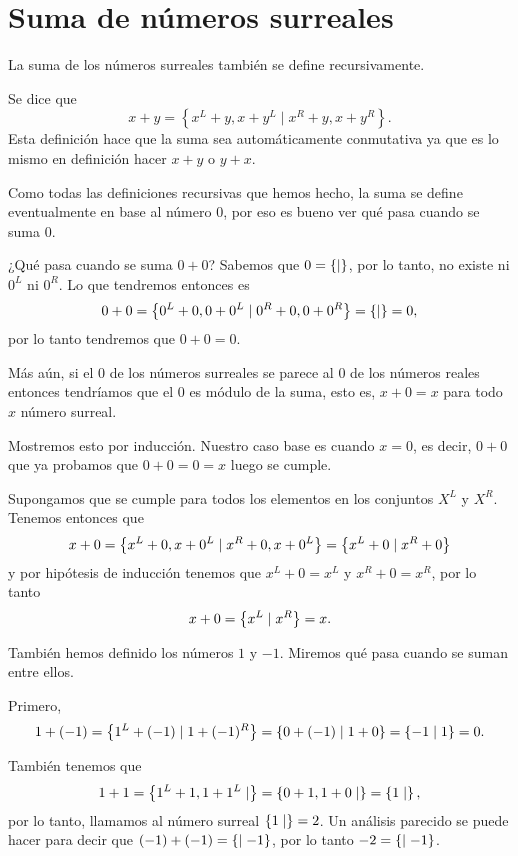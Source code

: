 \section{Suma de números surreales}

    La suma de los números surreales también se define recursivamente.
    
    \begin{definition}
        Se dice que
        \[
            x + y  = \left\{x^L+y, x+y^L\;|\;x^R+y, x+y^R\right\}.
        \]
        Esta definici\'on hace que la suma sea autom\'aticamente conmutativa ya que es lo mismo en definici\'on hacer $x+y$ o $y+x$.
    \end{definition}

    Como todas las definiciones recursivas que hemos hecho, la suma se define eventualmente en base al número $0$, por eso es bueno ver qué pasa cuando se suma $0$.

    \begin{example}
        ¿Qué pasa cuando se suma $0+0$? Sabemos que $0 = \left\{\mid \right\}$, por lo tanto, no existe ni $0^L$ ni $0^R$. Lo que tendremos entonces es
        \[
            0+0 = \left\{0^L+0, 0+0^L\mid 0^R+0, 0+0^R\right\} = \left\{\mid \right\} = 0,
        \]
        por lo tanto tendremos que $0+0 = 0$.
    \end{example}

    \begin{example}
        Más aún, si el $0$ de los números surreales se parece al $0$ de los números reales entonces tendríamos que el $0$ es módulo de la suma, esto es, $x+0 = x$ para todo $x$ n\'umero surreal.

        Mostremos esto por inducci\'on. Nuestro caso base es cuando $x = 0$, es decir, $0+0$ que ya probamos que $0+0=0=x$ luego se cumple.

        Supongamos que se cumple para todos los elementos en los conjuntos $X^L$ y $X^R$. Tenemos entonces que
        \[
            x + 0 = \left\{x^L+0, x+0^L\mid x^R+0, x+0^L\right\} = \left\{x^L+0\mid x^R+0\right\}
        \]
        y por hip\'otesis de inducci\'on tenemos que $x^L+0 = x^L$ y $x^R+0 = x^R$, por lo tanto 
        \[
            x + 0 = \left\{x^L\mid x^R\right\} = x.
        \]
    \end{example}

    \begin{example}
        Tambi\'en hemos definido los n\'umeros $1$ y $-1$. Miremos qu\'e pasa cuando se suman entre ellos.

        Primero,
        \[
            1 + (-1) = \left\{1^L + (-1)\mid 1+(-1)^R\right\} = \left\{0+(-1)\mid 1+0\right\} = \left\{-1\mid 1\right\} = 0.
        \]

        Tambi\'en tenemos que
        \[
            1 + 1 = \left\{1^L+1, 1+1^L\mid \right\} = \left\{0+1,1+0\mid \right\} = \left\{1\mid \right\},
        \]
        por lo tanto, llamamos al n\'umero surreal $\left\{1\mid \right\} = 2$. Un an\'alisis parecido se puede hacer para decir que $(-1)+(-1) = \left\{\mid -1\right\}$, por lo tanto $-2 = \left\{\mid -1\right\}$.
    \end{example}


